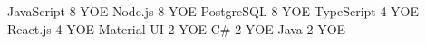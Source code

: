\begin{cvhonors}
  \cvhonor
    {JavaScript}
    {8 YOE}
    {\faStar \faStar \faStar \faStar \faStar}
    {}
  \cvhonor
    {Node.js}
    {8 YOE}
    {\faStar \faStar \faStar \faStar \faStar}
    {} 
  \cvhonor
    {PostgreSQL}
    {8 YOE}
    {\faStar \faStar \faStar \faStar \faStar }
    {}
  \cvhonor
    {TypeScript }
    {4 YOE}
    {\faStar \faStar \faStarHalfEmpty \faStarO \faStarO}
    {}
  \cvhonor
    {React.js }
    {4 YOE}
    {\faStar \faStar \faStarHalfEmpty \faStarO \faStarO}
    {} 
  \cvhonor
    {Material UI }
    {2 YOE}
    {\faStar \faStarHalfEmpty \faStarO \faStarO \faStarO}
    {}
  \cvhonor
    {C\#}
    {2 YOE}
    {\faStar \faStarHalfEmpty \faStarO \faStarO \faStarO}
    {}  
  \cvhonor
    {Java}
    {2 YOE}
    {\faStar \faStarHalfEmpty \faStarO \faStarO \faStarO}
    {}      
\end{cvhonors}
